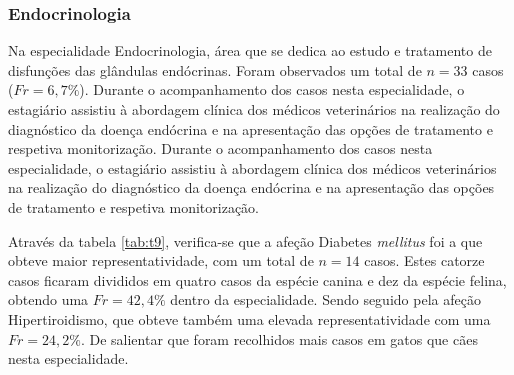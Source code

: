 \subsubsection{Endocrinologia}

Na especialidade Endocrinologia, área que se dedica ao estudo e tratamento de disfunções das glândulas endócrinas. Foram observados um total de $n=33$ casos ($Fr=6,7\%$). Durante o acompanhamento dos casos nesta especialidade, o estagiário assistiu à abordagem clínica dos médicos veterinários na realização do diagnóstico da doença endócrina e na apresentação das opções de tratamento e respetiva monitorização.
Durante o acompanhamento dos casos nesta especialidade, o estagiário assistiu à abordagem clínica dos médicos veterinários na realização do diagnóstico da doença endócrina e na apresentação das opções de tratamento e respetiva monitorização.

Através da tabela \ref{tab:t9}, verifica-se que a afeção Diabetes \textit{mellitus} foi a que obteve maior representatividade, com um total de $n=14$ casos. Estes catorze casos ficaram divididos em quatro casos da espécie canina e dez da espécie felina, obtendo uma $Fr=42,4\%$ dentro da especialidade. Sendo seguido pela afeção Hipertiroidismo, que obteve também uma elevada representatividade com uma $Fr=24,2\%$. De salientar que foram recolhidos mais casos em gatos que cães nesta especialidade.

